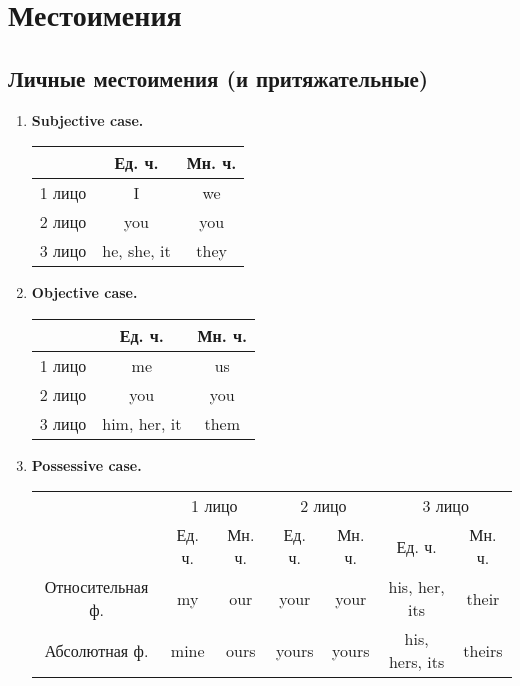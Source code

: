 \documentclass[oneside]{book}
\begin{document}
	\chapter{Местоимения}
	\section{Личные местоимения (и притяжательные)}
	\begin{enumerate}
		\item \textbf{Subjective case.}
		\begin{center}
			\begin{tabular}{|c|c|c|}
				\hline

				& Ед. ч. & Мн. ч.
				\\
				\hline

				1 лицо & I & we
				\\
				\hline

				2 лицо & you & you
				\\
				\hline

				3 лицо & he, she, it & they
				\\
				\hline
			\end{tabular}
		\end{center}

		\item \textbf{Objective case.}
		\begin{center}
			\begin{tabular}{|c|c|c|}
				\hline

				& Ед. ч. & Мн. ч.
				\\
				\hline

				1 лицо & me & us
				\\
				\hline

				2 лицо & you & you
				\\
				\hline

				3 лицо & him, her, it & them
				\\
				\hline
			\end{tabular}
		\end{center}

		\item \textbf{Possessive case.}
		\begin{center}
			\begin{tabular}{|c|cc|cc|cc|}
				\hline
				\multirow{2}{*}{}& \multicolumn{2}{c|}{1 лицо}         & \multicolumn{2}{c|}{2 лицо}          & \multicolumn{2}{c|}{3 лицо}                  \\ \cline{2-7} 
								 & \multicolumn{1}{c|}{Ед. ч.}& Мн. ч. & \multicolumn{1}{c|}{Ед. ч.} & Мн. ч. & \multicolumn{1}{c|}{Ед. ч.}         & Мн. ч. \\ \hline
				Относительная ф. & \multicolumn{1}{c|}{my}    & our    & \multicolumn{1}{c|}{your}   & your   & \multicolumn{1}{c|}{his, her, its}  & their  \\ \hline
				Абсолютная ф.    & \multicolumn{1}{c|}{mine}  & ours   & \multicolumn{1}{c|}{yours}  & yours  & \multicolumn{1}{c|}{his, hers, its} & theirs \\ \hline
			\end{tabular}
		\end{center}
	\end{enumerate}
\end{document}
